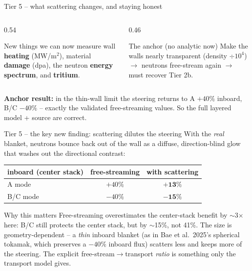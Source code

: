 \documentclass[aspectratio=169]{beamer}
\newcommand{\keyword}[1]{\textcolor{blue!60!black}{\textbf{#1}}}
\begin{document}
\begin{frame}{Tier 5 -- what scattering changes, and staying honest}
  \begin{columns}[T]
    \begin{column}{0.54\linewidth}
      \begin{block}{New things we can now measure}
        \footnotesize wall \keyword{heating} (MW/m$^2$), material \keyword{damage} (dpa), the neutron \keyword{energy spectrum}, and \keyword{tritium}.
      \end{block}
    \end{column}
    \begin{column}{0.46\linewidth}
      \begin{block}{The anchor (no analytic now)}
        \footnotesize Make the walls nearly transparent (density $\div 10^4$) $\to$ neutrons free-stream again $\to$ must \alert{recover Tier 2b}.
      \end{block}
    \end{column}
  \end{columns}
  \vfill
  \keyword{Anchor result:} in the thin-wall limit the steering returns to
  \alert{A $+40\%$ inboard, B/C $-40\%$} -- exactly the validated free-streaming
  values. So the full layered model + source are correct.
\end{frame}

\begin{frame}{Tier 5 -- the key new finding: scattering \alert{dilutes} the steering}
  With the \emph{real} blanket, neutrons bounce back out of the wall as a diffuse, direction-blind glow that washes out the directional contrast:
  \begin{center}\footnotesize
  \begin{tabular}{lcc}
    \toprule
    inboard (center stack) & free-streaming & \alert{with scattering} \\
    \midrule
    A mode & $+40\%$ & $\mathbf{+13\%}$ \\
    B/C mode & $-40\%$ & $\mathbf{-15\%}$ \\
    \bottomrule
  \end{tabular}
  \end{center}
  \vfill
  \begin{block}{Why this matters}
    \alert{Free-streaming overestimates the center-stack benefit by $\sim$3$\times$ here:} B/C still protects the center stack, but by $\sim$15\%, not 41\%. The size is \alert{geometry-dependent} -- a \emph{thin} inboard blanket (as in Bae et al.\ 2025's spherical tokamak, which preserves a $-40\%$ inboard flux) scatters less and keeps more of the steering. The explicit free-stream$\to$transport \emph{ratio} is something only the transport model gives.
  \end{block}
\end{frame}
\end{document}
